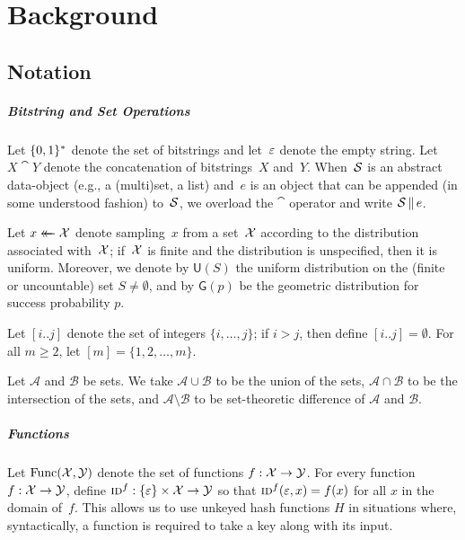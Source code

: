 \chapter{Background}


\section{Notation}

\paragraph{Bitstring and Set Operations}

Let $\{0,1\}^*$ denote the set of bitstrings and let~$\varepsilon$ denote the empty
string. Let $X \cat Y$ denote the concatenation of bitstrings~$X$ and~$Y$.  When~$\mathcal{S}$ is an abstract data-object (e.g., a (multi)set, a list) and~$e$ is an object that can be appended (in some understood fashion) to~$\mathcal{S}$, we overload the $\cat$ operator and write $\mathcal{S} \, \| \, e$.

Let $x \mathrel{\leftarrow\mkern-14mu\leftarrow} \mathcal{X}$ denote sampling~$x$ from a set~$\mathcal{X}$ according to the distribution associated with~$\mathcal{X}$; if~$\mathcal{X}$ is finite and the distribution is unspecified, then it is uniform. Moreover, we denote by $\mathsf{U}(S)$ the uniform distribution on the (finite or uncountable) set $S\neq\emptyset$, and by $\mathsf{G}(p)$ be the geometric distribution for success probability $p$.

Let $[i..j]$ denote the set of integers $\{i, \ldots, j\}$; if $i > j$, then define $[i..j] = \emptyset$. For all $m \geq 2$, let $[m] = \{1,2,\ldots,m\}$.

Let $\mathcal{A}$ and $\mathcal{B}$ be sets. We take $\mathcal{A} \cup \mathcal{B}$ to be the union of the sets, $\mathcal{A} \cap \mathcal{B}$ to be the intersection of the sets, and $\mathcal{A} \setminus \mathcal{B}$ to be set-theoretic difference of $\mathcal{A}$ and $\mathcal{B}$.

\paragraph{Functions}

Let $\mathrm{Func}(\mathcal{X},\mathcal{Y})$ denote the set of functions $f:\mathcal{X}\to\mathcal{Y}$. For every function~$f: \mathcal{X} \to \mathcal{Y}$, define $\textnormal{\textsc{id}}^f: \{\varepsilon\} \times \mathcal{X} \to \mathcal{Y}$ so that $\textnormal{\textsc{id}}^f(\varepsilon, x) = f(x)$ for all $x$ in the domain of~$f$. This allows us to use unkeyed hash functions $H$ in situations where, syntactically, a function is required to take a key along with its input. 


